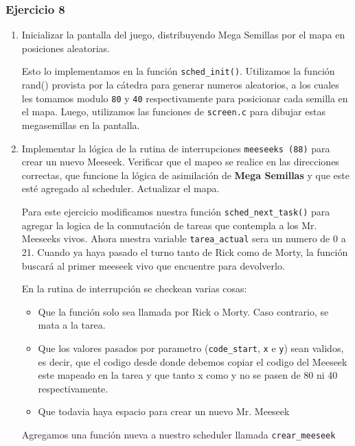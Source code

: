 \documentclass[a4paper]{article}
\begin{document}
\subsubsection{Ejercicio 8}

\begin{enumerate}
	\item Inicializar la pantalla del juego, distribuyendo Mega Semillas por el mapa en posiciones aleatorias.
	
	Esto lo implementamos en la funci\'on \texttt{sched\_init()}. Utilizamos la funci\'on rand() provista por la c\'atedra para generar numeros aleatorios, a los cuales les tomamos modulo \texttt{80} y \texttt{40} respectivamente para posicionar cada semilla en el mapa. Luego, utilizamos las funciones de \texttt{screen.c} para dibujar estas megasemillas en la pantalla.
	
	\item Implementar la l\'ogica de la rutina de interrupciones \texttt{meeseeks (88)} para crear un nuevo Meeseek. Verificar que el mapeo se realice en las direcciones correctas, que funcione la l\'ogica de asimilaci\'on de \textbf{Mega Semillas} y que este est\'e agregado al scheduler. Actualizar el mapa.
	
	Para este ejercicio modificamos nuestra funci\'on \texttt{sched\_next\_task()} para agregar la logica de la conmutaci\'on de tareas que contempla a los Mr. Meeseeks vivos. Ahora nuestra variable \texttt{tarea\_actual} sera un numero de 0 a 21. Cuando ya haya pasado el turno tanto de Rick como de Morty, la funci\'on buscar\'a al primer meeseek vivo que encuentre para devolverlo.
	
	En la rutina de interrupci\'on se checkean varias cosas: 
	
	\begin{itemize}
		\item Que la funci\'on solo sea llamada por Rick o Morty. Caso contrario, se mata a la tarea.
		\item Que los valores pasados por parametro (\texttt{code\_start}, \texttt{x} e \texttt{y}) sean validos, es decir, que el codigo desde donde debemos copiar el codigo del Meeseek este mapeado en la tarea y que tanto x como y no se pasen de 80 ni 40 respectivamente.
		\item Que todavia haya espacio para crear un nuevo Mr. Meeseek
	\end{itemize}
	
	Agregamos una funci\'on nueva a nuestro scheduler llamada \texttt{crear\_meeseek}


\end{enumerate}
\end{document}
